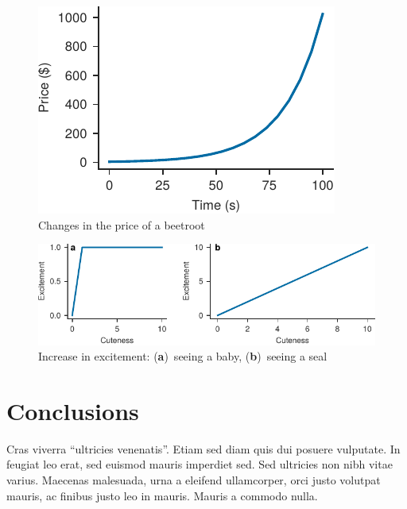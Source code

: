 \documentclass[12pt]{article}
\begin{document}
\begin{figure}
	\centering
	\includegraphics{prices}
	\caption{Changes in the price of a beetroot}%
	\label{fig:prices}
\end{figure}

\begin{figure}
	\centering
	\includegraphics{excitement}
	\caption{Increase in excitement: (\textbf{a})~seeing a baby, (\textbf{b})~seeing a seal}%
	\label{fig:excitement}
\end{figure}

\section{Conclusions}

Cras viverra \enquote{ultricies venenatis}. Etiam sed diam quis dui posuere vulputate. In feugiat leo erat, sed euismod mauris imperdiet sed. Sed ultricies non nibh vitae varius. Maecenas malesuada, urna a eleifend ullamcorper, orci justo volutpat mauris, ac finibus justo leo in mauris. Mauris a commodo nulla.

\printbibliography%
\end{document}
